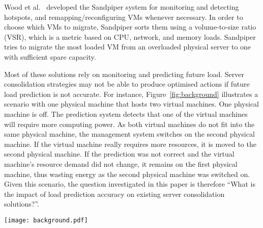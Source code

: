Wood et al.~\cite{wood2009sandpiper} developed the Sandpiper system for monitoring and detecting hotspots, and remapping/reconfiguring VMs whenever necessary. In order to choose which VMs to migrate, Sandpiper sorts them using a volume-to-size ratio (VSR), which is a metric based on CPU, network, and memory loads. Sandpiper tries to migrate the most loaded VM from an overloaded physical server to one with sufficient spare capacity.

Most of these solutions rely on monitoring and predicting future load. Server
consolidation strategies may not be able to produce optimised actions if future
load prediction is not accurate. For instance, Figure~\ref{fig:background} illustrates a scenario with one physical machine that hosts two virtual machines. One physical machine is off. The prediction system detects that one of the virtual machines will require more computing power. As both virtual machines do not fit into the same physical machine, the management system switches on the second physical machine. If the virtual machine really requires more resources, it is moved to the second physical machine. If the prediction was not correct and the virtual machine’s resource demand did not change, it remains on the first physical machine, thus wasting energy as the second physical machine was switched on. Given this scenario, the question investigated in this paper is therefore “What is the impact of load prediction accuracy on existing server consolidation solutions?”.

\begin{figure*}[th]
\centerline{\texttt{[image: background.pdf]}}
\vspace{-2mm}
\caption{Illustrative scenario where one physical machine hosts two virtual machines. One physical machine is off. If the prediction is correct, the second physical machine is switched on and the virtual machine is moved to it. If the prediction is not correct, the second machine is switched on but no virtual machine is moved to it, thus wasting energy.}
\vspace{-1mm}
\label{fig:background}
\end{figure*}

\cite{netto2011use}
